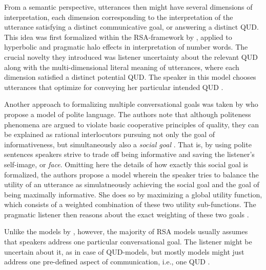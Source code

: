 From a semantic perspective, utterances then might have several dimensions of interpretation, each dimension corresponding to the interpretation of the utterance satisfying a distinct communicative goal, or answering a distinct QUD. This idea was first formalized within the RSA-framework by \textcite{kao2014nonliteral}, applied to hyperbolic and pragmatic halo effects in interpretation of number words. The crucial novelty they introduced was listener uncertainty about the relevant QUD along with the multi-dimensional literal meaning of utterances, where each dimension satisfied a distinct potential QUD. The speaker in this model chooses utterances that optimize for conveying her particular intended QUD \parencite{kao2014nonliteral}. %

Another approach to formalizing multiple conversational goals was taken by \textcite{yoon2016talking} who propose a model of polite language. The authors note that although politeness phenomena are argued to violate basic cooperative principles of quality, they can be explained as rational interlocutors pursuing not only the goal of informativeness, but simultaneously also a \emph{social goal} \parencite[cf.][]{brown1987politeness, yoon2016talking}. That is, by using polite sentences speakers strive to trade off being informative and saving the listener's self-image, or \emph{face}. Omitting here the details of how exactly this social goal is formalized, the authors propose a model wherein the speaker tries to balance the utility of an utterance as simulatneously achieving the social goal and the goal of being maximally informative. She does so by maximizing a global utility function, which consists of a weighted combination of these two utility sub-functions. The pragmatic listener then reasons about the exact weighting of these two goals \parencite{yoon2016talking}. 

Unlike the models by \textcite{kao2014nonliteral, yoon2016talking}, however, the majority of RSA models usually assumes that speakers address one particular conversational goal. The listener might be uncertain about it, as in case of QUD-models, but mostly models might just address one pre-defined aspect of communication, i.e., one QUD \parencite[see][for an overview of various RSA models]{problang}. 

